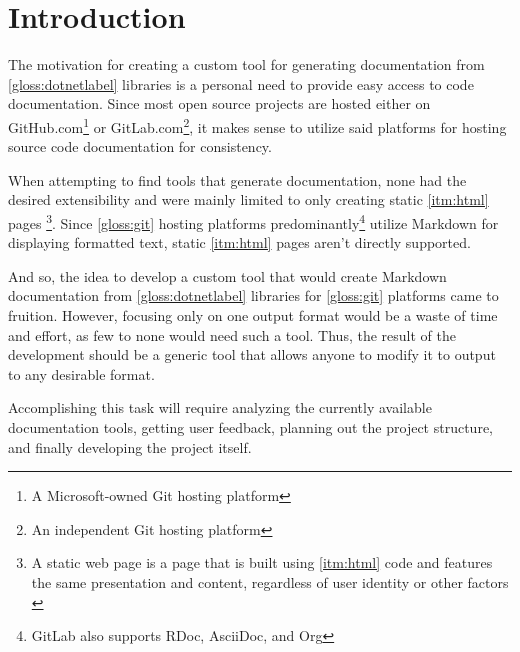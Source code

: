 \chapter*{Introduction}

The motivation for creating a custom tool for generating documentation from \ref{gloss:dotnetlabel} libraries is a personal need to provide easy access to code documentation. Since most open source projects are hosted either on GitHub.com\footnote{A Microsoft-owned Git hosting platform} or GitLab.com\footnote{An independent Git hosting platform}, it makes sense to utilize said platforms for hosting source code documentation for consistency.

When attempting to find tools that generate documentation, none had the desired extensibility and were mainly limited to only creating static \ref{itm:html} pages
\footnote{A static web page is a page that is built using \ref{itm:html} code and features the same presentation and content, regardless of user identity or other factors \cite{techopedia_what_2017}}.
Since \ref{gloss:git} hosting platforms predominantly\footnote{GitLab also supports RDoc, AsciiDoc, and Org} utilize Markdown for displaying formatted text, static \ref{itm:html} pages aren't directly supported.

And so, the idea to develop a custom tool that would create Markdown documentation from \ref{gloss:dotnetlabel} libraries for \ref{gloss:git} platforms came to fruition. However, focusing only on one output format would be a waste of time and effort, as few to none would need such a tool. Thus, the result of the development should be a generic tool that allows anyone to modify it to output to any desirable format.

Accomplishing this task will require analyzing the currently available documentation tools, getting user feedback, planning out the project structure, and finally developing the project itself.

